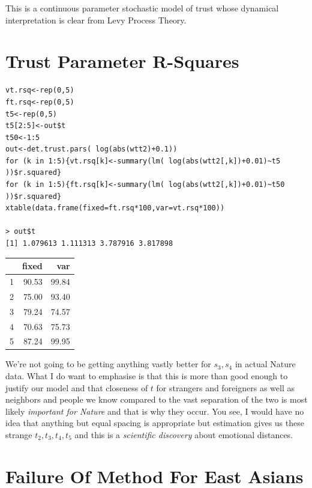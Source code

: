 \documentclass{amsart}
\begin{document}
This is a continuous parameter stochastic model of trust whose dynamical interpretation is clear from Levy Process Theory.

\section{Trust Parameter R-Squares}

\begin{verbatim}
vt.rsq<-rep(0,5)
ft.rsq<-rep(0,5)
t5<-rep(0,5)
t5[2:5]<-out$t
t50<-1:5
out<-det.trust.pars( log(abs(wtt2)+0.1))
for (k in 1:5){vt.rsq[k]<-summary(lm( log(abs(wtt2[,k])+0.01)~t5 ))$r.squared}
for (k in 1:5){ft.rsq[k]<-summary(lm( log(abs(wtt2[,k])+0.01)~t50 ))$r.squared}
xtable(data.frame(fixed=ft.rsq*100,var=vt.rsq*100))

> out$t
[1] 1.079613 1.111313 3.787916 3.817898
\end{verbatim}

\begin{table}[ht]
\centering
\begin{tabular}{rrr}
  \hline
 & fixed & var \\ 
  \hline
1 & 90.53 & 99.84 \\ 
  2 & 75.00 & 93.40 \\ 
  3 & 79.24 & 74.57 \\ 
  4 & 70.63 & 75.73 \\ 
  5 & 87.24 & 99.95 \\ 
   \hline
\end{tabular}
\end{table}

We're not going to be getting anything vastly better for $s_3,s_4$ in actual Nature data.  What I do want to emphasise is that this is more than good enough to justify our model and that closeness of $t$ for strangers and foreigners as well as neighbors and people we know compared to the vast separation of the two is most likely {\em important for Nature} and that is why they occur.  You see, I would have no idea that anything but equal spacing is appropriate but estimation gives us these strange $t_2,t_3,t_4,t_5$ and this is a {\em scientific discovery} about emotional distances.

\section{Failure Of Method For East Asians}
\end{document}

